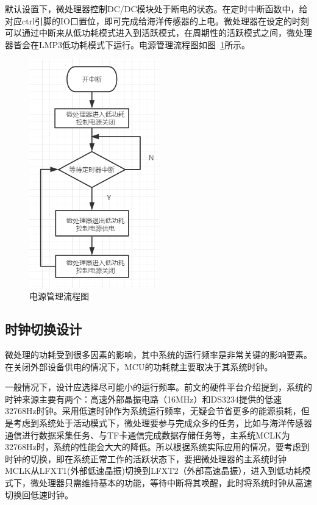 默认设置下，微处理器控制DC/DC模块处于断电的状态。在定时中断函数中，给对应ctrl引脚的IO口置位，即可完成给海洋传感器的上电。微处理器在设定的时刻可以通过中断来从低功耗模式进入到活跃模式，在周期性的活跃模式之间，微处理器皆会在LMP3低功耗模式下运行。电源管理流程图如图~\ref{fig:电源管理流程图}所示。
\begin{figure}[ht]
    \centering
	\includegraphics[width=0.5\textwidth]{fig/电源管理流程图.png}
	\caption{电源管理流程图}
	\label{fig:电源管理流程图}
\end{figure}
\subsection{时钟切换设计}
微处理的功耗受到很多因素的影响，其中系统的运行频率是非常关键的影响要素。在关闭外部设备供电的情况下，MCU的功耗就主要取决于其系统时钟。

一般情况下，设计应选择尽可能小的运行频率。前文的硬件平台介绍提到，系统的时钟来源主要有两个：高速外部晶振电路（16MHz）和DS3234提供的低速32768Hz时钟。采用低速时钟作为系统运行频率，无疑会节省更多的能源损耗，但是考虑到系统处于活动模式下，微处理要参与完成众多的任务，比如与海洋传感器通信进行数据采集任务、与TF卡通信完成数据存储任务等，主系统MCLK为32768Hz时，系统的性能会大大的降低。所以根据系统实际应用的情况，要考虑到时钟的切换，即在系统正常工作的活跃状态下，要把微处理器的主系统时钟MCLK从LFXT1(外部低速晶振)切换到LFXT2（外部高速晶振），进入到低功耗模式下，微处理器只需维持基本的功能，等待中断将其唤醒，此时将系统时钟从高速切换回低速时钟。


